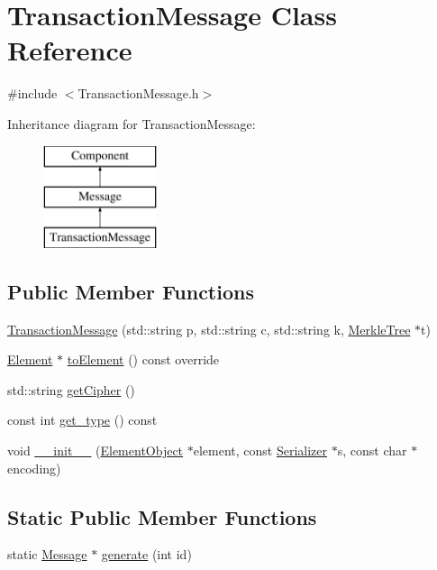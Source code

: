 \hypertarget{classTransactionMessage}{}\section{Transaction\+Message Class Reference}
\label{classTransactionMessage}


{\ttfamily \#include $<$Transaction\+Message.\+h$>$}

Inheritance diagram for Transaction\+Message\+:\begin{figure}[H]
\begin{center}
\leavevmode
\includegraphics[height=3.000000cm]{classTransactionMessage}
\end{center}
\end{figure}
\subsection*{Public Member Functions}
\begin{DoxyCompactItemize}
\item 
\mbox{\hyperlink{classTransactionMessage_a1be404df5185ea0912d23da9f2918649}{Transaction\+Message}} (std\+::string p, std\+::string c, std\+::string k, \mbox{\hyperlink{classMerkleTree}{Merkle\+Tree}} $\ast$t)
\item 
\mbox{\hyperlink{classElement}{Element}} $\ast$ \mbox{\hyperlink{classTransactionMessage_ae20e7d6a7b5811bb56a32ec6af59b8e2}{to\+Element}} () const override
\item 
std\+::string \mbox{\hyperlink{classTransactionMessage_abca09bbc62737a7d896f5478f3b3389a}{get\+Cipher}} ()
\item 
const int \mbox{\hyperlink{classMessage_a2a576dcffd45c4574fcdf2897ec26086}{get\+\_\+type}} () const
\item 
void \mbox{\hyperlink{classComponent_a28212595f8ee85fe009bd233bc99b2fc}{\+\_\+\+\_\+init\+\_\+\+\_\+}} (\mbox{\hyperlink{classElementObject}{Element\+Object}} $\ast$element, const \mbox{\hyperlink{classSerializer}{Serializer}} $\ast$s, const char $\ast$encoding)
\end{DoxyCompactItemize}
\subsection*{Static Public Member Functions}
\begin{DoxyCompactItemize}
\item 
static \mbox{\hyperlink{classMessage}{Message}} $\ast$ \mbox{\hyperlink{classMessage_ad92a0e1cfa5b5a503ec9c61833e3e5ea}{generate}} (int id)
\end{DoxyCompactItemize}
